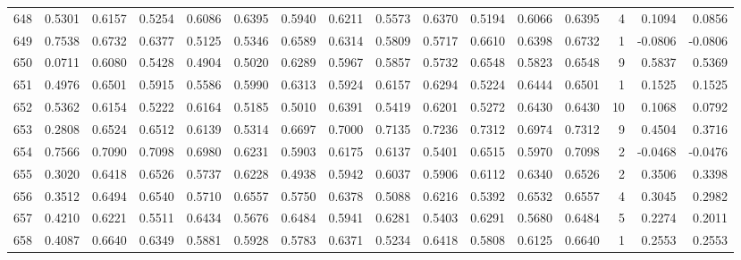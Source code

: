 \begin{tabular}{lrrrrrrrrrrrrrrr}
648 &      0.5301 &  0.6157 &  0.5254 &  0.6086 &  0.6395 &  0.5940 &  0.6211 &  0.5573 &  0.6370 &  0.5194 &   0.6066 &     0.6395 &      4 &                    0.1094 &                     0.0856 \\
649 &      0.7538 &  0.6732 &  0.6377 &  0.5125 &  0.5346 &  0.6589 &  0.6314 &  0.5809 &  0.5717 &  0.6610 &   0.6398 &     0.6732 &      1 &                   -0.0806 &                    -0.0806 \\
650 &      0.0711 &  0.6080 &  0.5428 &  0.4904 &  0.5020 &  0.6289 &  0.5967 &  0.5857 &  0.5732 &  0.6548 &   0.5823 &     0.6548 &      9 &                    0.5837 &                     0.5369 \\
651 &      0.4976 &  0.6501 &  0.5915 &  0.5586 &  0.5990 &  0.6313 &  0.5924 &  0.6157 &  0.6294 &  0.5224 &   0.6444 &     0.6501 &      1 &                    0.1525 &                     0.1525 \\
652 &      0.5362 &  0.6154 &  0.5222 &  0.6164 &  0.5185 &  0.5010 &  0.6391 &  0.5419 &  0.6201 &  0.5272 &   0.6430 &     0.6430 &     10 &                    0.1068 &                     0.0792 \\
653 &      0.2808 &  0.6524 &  0.6512 &  0.6139 &  0.5314 &  0.6697 &  0.7000 &  0.7135 &  0.7236 &  0.7312 &   0.6974 &     0.7312 &      9 &                    0.4504 &                     0.3716 \\
654 &      0.7566 &  0.7090 &  0.7098 &  0.6980 &  0.6231 &  0.5903 &  0.6175 &  0.6137 &  0.5401 &  0.6515 &   0.5970 &     0.7098 &      2 &                   -0.0468 &                    -0.0476 \\
655 &      0.3020 &  0.6418 &  0.6526 &  0.5737 &  0.6228 &  0.4938 &  0.5942 &  0.6037 &  0.5906 &  0.6112 &   0.6340 &     0.6526 &      2 &                    0.3506 &                     0.3398 \\
656 &      0.3512 &  0.6494 &  0.6540 &  0.5710 &  0.6557 &  0.5750 &  0.6378 &  0.5088 &  0.6216 &  0.5392 &   0.6532 &     0.6557 &      4 &                    0.3045 &                     0.2982 \\
657 &      0.4210 &  0.6221 &  0.5511 &  0.6434 &  0.5676 &  0.6484 &  0.5941 &  0.6281 &  0.5403 &  0.6291 &   0.5680 &     0.6484 &      5 &                    0.2274 &                     0.2011 \\
658 &      0.4087 &  0.6640 &  0.6349 &  0.5881 &  0.5928 &  0.5783 &  0.6371 &  0.5234 &  0.6418 &  0.5808 &   0.6125 &     0.6640 &      1 &                    0.2553 &                     0.2553 \\

\end{tabular}
